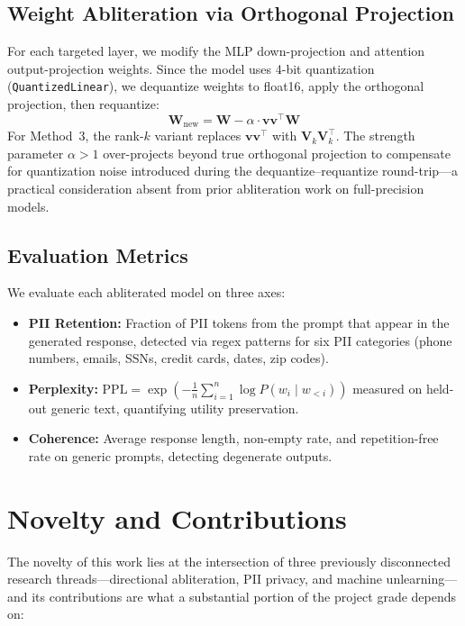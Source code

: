 \documentclass[11pt]{article}
\begin{document}
\subsection{Weight Abliteration via Orthogonal Projection}

For each targeted layer, we modify the MLP down-projection and attention output-projection weights. Since the model uses 4-bit quantization (\texttt{QuantizedLinear}), we dequantize weights to float16, apply the orthogonal projection, then requantize:
\begin{equation}
\mathbf{W}_{\text{new}} = \mathbf{W} - \alpha \cdot \mathbf{v}\mathbf{v}^{\top}\mathbf{W}
\end{equation}
For Method~3, the rank-$k$ variant replaces $\mathbf{v}\mathbf{v}^{\top}$ with $\mathbf{V}_k\mathbf{V}_k^{\top}$. The strength parameter $\alpha > 1$ over-projects beyond true orthogonal projection to compensate for quantization noise introduced during the dequantize--requantize round-trip---a practical consideration absent from prior abliteration work on full-precision models.

\subsection{Evaluation Metrics}

We evaluate each abliterated model on three axes:
\begin{itemize}
    \item \textbf{PII Retention:} Fraction of PII tokens from the prompt that appear in the generated response, detected via regex patterns for six PII categories (phone numbers, emails, SSNs, credit cards, dates, zip codes).
    \item \textbf{Perplexity:} $\text{PPL} = \exp\!\left(-\frac{1}{n}\sum_{i=1}^{n}\log P(w_i \mid w_{<i})\right)$ measured on held-out generic text, quantifying utility preservation.
    \item \textbf{Coherence:} Average response length, non-empty rate, and repetition-free rate on generic prompts, detecting degenerate outputs.
\end{itemize}

\section{Novelty and Contributions}

The novelty of this work lies at the intersection of three previously disconnected research threads---directional abliteration, PII privacy, and machine unlearning---and its contributions are what a substantial portion of the project grade depends on:
\end{document}
